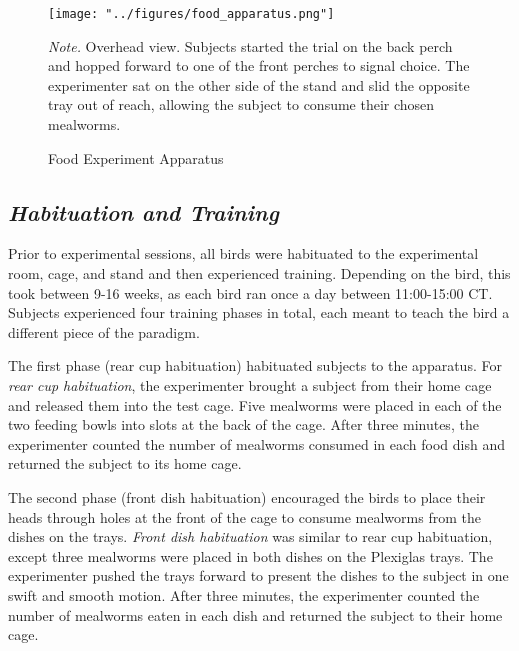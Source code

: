 \documentclass[
  ,pub,floatsintext]{apa6}
\begin{document}
\begin{figure}[h]
\caption{\newline Food Experiment Apparatus \label{fig:foodapp}}
\begin{center}
\texttt{[image: "../figures/food\_apparatus.png"]}
\end{center}

\textit{Note.} Overhead view. Subjects started the trial on the back perch and hopped forward to one of the front perches to signal choice. The experimenter sat on the other side of the stand and slid the opposite tray out of reach, allowing the subject to consume their chosen mealworms.
\end{figure}

\hypertarget{habituation-and-training}{%
\subsection{\texorpdfstring{\emph{Habituation and Training}}{Habituation and Training}}\label{habituation-and-training}}

Prior to experimental sessions, all birds were habituated to the experimental room, cage, and stand and then experienced training. Depending on the bird, this took between 9-16 weeks, as each bird ran once a day between 11:00-15:00 CT. Subjects experienced four training phases in total, each meant to teach the bird a different piece of the paradigm.

The first phase (rear cup habituation) habituated subjects to the apparatus. For \emph{rear cup habituation}, the experimenter brought a subject from their home cage and released them into the test cage. Five mealworms were placed in each of the two feeding bowls into slots at the back of the cage. After three minutes, the experimenter counted the number of mealworms consumed in each food dish and returned the subject to its home cage.

The second phase (front dish habituation) encouraged the birds to place their heads through holes at the front of the cage to consume mealworms from the dishes on the trays. \emph{Front dish habituation} was similar to rear cup habituation, except three mealworms were placed in both dishes on the Plexiglas trays. The experimenter pushed the trays forward to present the dishes to the subject in one swift and smooth motion. After three minutes, the experimenter counted the number of mealworms eaten in each dish and returned the subject to their home cage.
\end{document}
